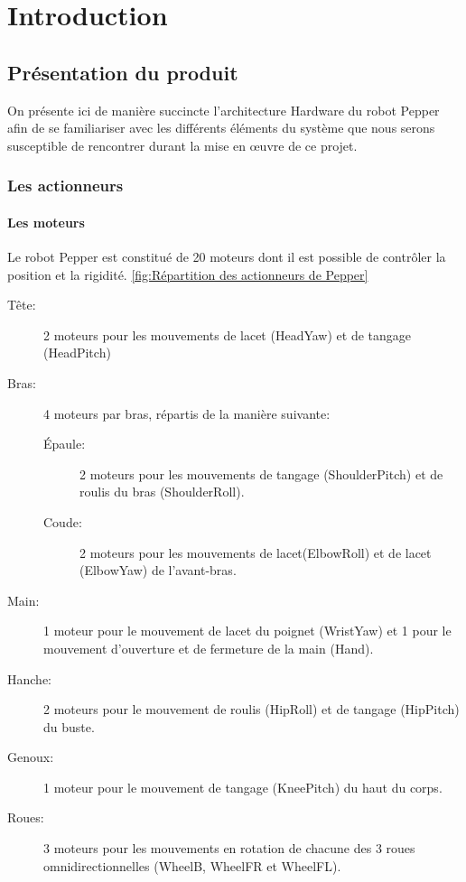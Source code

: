 \chapter{Introduction}
\label{Introduction}
\thispagestyle{fancy}

\section{Présentation du produit}
\label{Introduction:Présentation du produit}
On présente ici de manière succincte l'architecture Hardware du robot Pepper afin de se familiariser avec les différents éléments du système que nous serons susceptible de rencontrer durant la mise en œuvre de ce projet.  

\subsection{Les actionneurs}
\label{Introduction:Présentation du produit:Les actionneurs}
\subsubsection{Les moteurs}
\label{Introduction:Présentation du produit:Les actionneurs: Les moteurs}
Le robot Pepper est constitué de 20 moteurs dont il est possible de contrôler la position et la rigidité. \ref*{fig:Répartition des actionneurs de Pepper}
\begin{description}
	\item [Tête:] 2 moteurs pour les mouvements de lacet (HeadYaw) et de tangage (HeadPitch)
	\item [Bras:] 4 moteurs par bras, répartis de la manière suivante: 
	\begin{description}
		\item [Épaule:] 2 moteurs pour les mouvements de tangage (ShoulderPitch) et de roulis du bras (ShoulderRoll).
		\item [Coude:] 2 moteurs pour les mouvements de lacet(ElbowRoll) et de lacet (ElbowYaw) de l'avant-bras.
	\end{description}
	\item [Main:] 1 moteur pour le mouvement de lacet du poignet (WristYaw) et 1 pour le mouvement d'ouverture et de fermeture de la main (Hand).
	\item [Hanche:] 2 moteurs pour le mouvement de roulis (HipRoll) et de tangage (HipPitch) du buste.
	\item [Genoux:] 1 moteur pour le mouvement de tangage (KneePitch) du haut du corps.
	\item [Roues:] 3 moteurs pour les mouvements en rotation de chacune des 3 roues omnidirectionnelles (WheelB, WheelFR et WheelFL).
\end{description}

